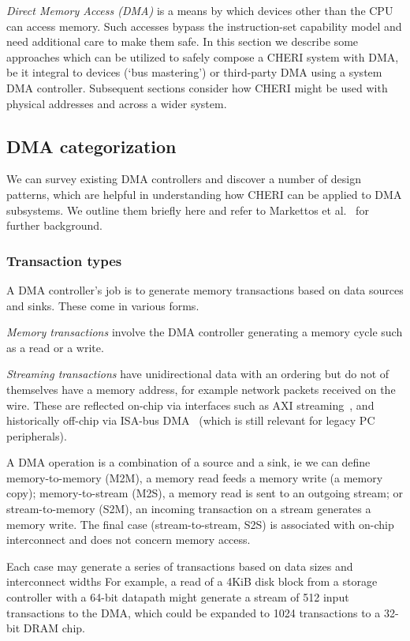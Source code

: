 \emph{Direct Memory Access (DMA)} is a means by which devices other than the CPU can access memory.
Such accesses bypass the instruction-set capability model and need additional care to make them safe.
In this section we describe some approaches which can be utilized to safely compose a CHERI system with DMA, be it integral to devices (`bus mastering') or third-party DMA using a system DMA controller.
Subsequent sections consider how CHERI might be used with physical addresses and across a wider system.

\subsection{DMA categorization}
We can survey existing DMA controllers and discover a number of design patterns, which are helpful in understanding how CHERI can be applied to DMA subsystems.
We outline them briefly here and refer to Markettos et al.~\cite{DBLP:conf/micro/MarkettosBBNMW20} for further background.

\subsubsection{Transaction types}
A DMA controller's job is to generate memory transactions based on data sources and sinks.
These come in various forms.

\emph{Memory transactions} involve the DMA controller generating a memory cycle such as a read or a write.

\emph{Streaming transactions} have unidirectional data with an ordering but do not of themselves have a memory address, for example network packets received on the wire.
These are reflected on-chip via interfaces such as AXI streaming~\cite{arm-axistream}, and historically off-chip via ISA-bus DMA~\cite{ibmpctrm} (which is still relevant for legacy PC peripherals).

A DMA operation is a combination of a source and a sink, ie we can define memory-to-memory (M2M), a memory read feeds a memory write (a memory copy);
memory-to-stream (M2S), a memory read is sent to an outgoing stream; or
stream-to-memory (S2M), an incoming transaction on a stream generates a memory write.
The final case (stream-to-stream, S2S) is associated with on-chip interconnect and does not concern memory access.

Each case may generate a series of transactions based on data sizes and interconnect widths
For example, a read of a 4KiB disk block from a storage controller with a 64-bit datapath might generate a stream of 512 input transactions to the DMA, which could be expanded to 1024 transactions to a 32-bit DRAM chip.


